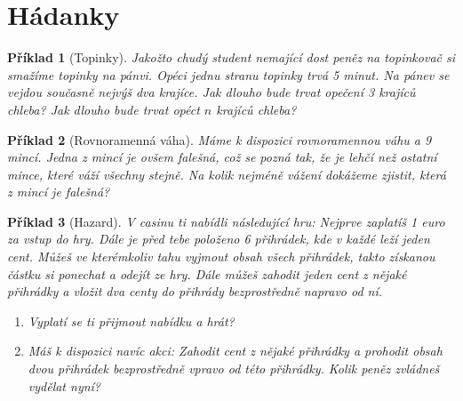 \documentclass[10pt]{article}
\theoremstyle{definitionstyle}
\theoremstyle{problemstyle}
\newtheorem{problem}{Příklad}
\begin{document}
\section{Hádanky}

\begin{problem}[Topinky]
Jakožto chudý student nemající dost peněz na topinkovač si smažíme topinky na pánvi. Opéci jednu stranu topinky trvá 5 minut. Na pánev se vejdou současně nejvýš dva krajíce. Jak dlouho bude trvat opečení 3 krajíců chleba? Jak dlouho bude trvat opéct $n$ krajíců chleba?
\end{problem}

\begin{problem}[Rovnoramenná váha]
Máme k dispozici rovnoramennou váhu a 9 mincí. Jedna z mincí je ovšem falešná, což se pozná tak, že je lehčí než ostatní mince, které váží všechny stejně. Na kolik nejméně vážení dokážeme zjistit, která z mincí je falešná?
\end{problem}

\begin{problem}[Hazard]
V casinu ti nabídli následující hru: Nejprve zaplatíš 1 euro za vstup do hry. Dále je před tebe položeno 6 přihrádek, kde v každé leží jeden cent. Můžeš ve kterémkoliv tahu vyjmout obsah všech přihrádek, takto získanou částku si ponechat a odejít ze hry. Dále můžeš zahodit jeden cent z nějaké přihrádky a vložit dva centy do přihrády bezprostředně napravo od ní.

\begin{enumerate}[label=(\alph*)]
\item Vyplatí se ti přijmout nabídku a hrát?
\item Máš k dispozici navíc akci: Zahodit cent z nějaké přihrádky a prohodit obsah dvou přihrádek bezprostředně vpravo od této přihrádky. Kolik peněz zvládneš vydělat nyní?
\end{enumerate}

\end{problem}

\vspace{1cm}
\end{document}
